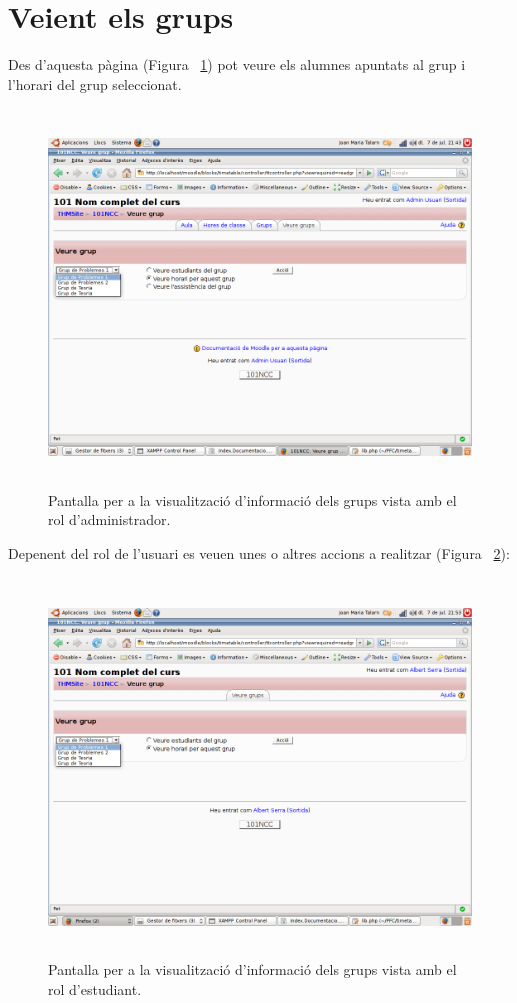 \documentclass[a4paper]{report}  %
\begin{document}
\section{Veient els grups}
Des d'aquesta pàgina (Figura ~\ref{fig:VeureGrup}) pot veure els alumnes apuntats al grup i l'horari del grup seleccionat.
		\begin{figure}[H] %
		\begin{center}
		\includegraphics[height=10cm,width=12cm]{img/VeureGrup.png}
		\caption[List caption]{Pantalla per a la visualització d'informació dels grups vista amb el rol d'administrador.}
		\label{fig:VeureGrup}
		\end{center}
		\end{figure}
Depenent del rol de l'usuari es veuen unes o altres accions a realitzar (Figura ~\ref{fig:VeureGrupRolStudent}):
		\begin{figure}[H] %
		\begin{center}
		\includegraphics[height=10cm,width=12cm]{img/VeureGrupRolStudent.png}
		\caption[List caption]{Pantalla per a la visualització d'informació dels grups vista amb el rol d'estudiant.}
		\label{fig:VeureGrupRolStudent}
		\end{center}
		\end{figure}
\end{document}
